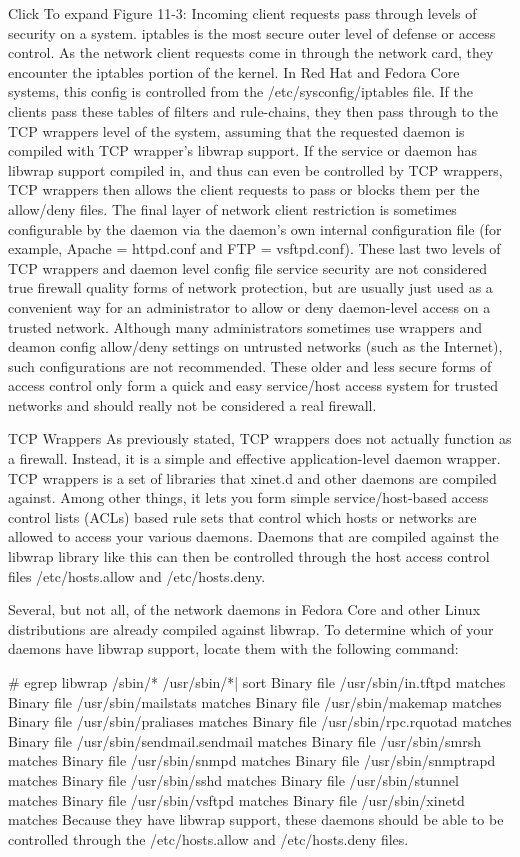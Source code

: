 \documentclass{article}
\begin{document}
\begin{itemize}
Click To expand 
Figure 11-3: Incoming client requests pass through levels of security on a system. iptables is the most secure outer level of defense or access control.
As the network client requests come in through the network card, they encounter the iptables portion of the kernel. In Red Hat and Fedora Core systems, this config is controlled from the /etc/sysconfig/iptables file. If the clients pass these tables of filters and rule-chains, they then pass through to the TCP wrappers level of the system, assuming that the requested daemon is compiled with TCP wrapper's libwrap support. If the service or daemon has libwrap support compiled in, and thus can even be controlled by TCP wrappers, TCP wrappers then allows the client requests to pass or blocks them per the allow/deny files. The final layer of network client restriction is sometimes configurable by the daemon via the daemon's own internal configuration file (for example, Apache = httpd.conf and FTP = vsftpd.conf). These last two levels of TCP wrappers and daemon level config file service security are not considered true firewall quality forms of network protection, but are usually just used as a convenient way for an administrator to allow or deny daemon-level access on a trusted network. Although many administrators sometimes use wrappers and deamon config allow/deny settings on untrusted networks (such as the Internet), such configurations are not recommended. These older and less secure forms of access control only form a quick and easy service/host access system for trusted networks and should really not be considered a real firewall.

TCP Wrappers
As previously stated, TCP wrappers does not actually function as a firewall. Instead, it is a simple and effective application-level daemon wrapper. TCP wrappers is a set of libraries that xinet.d and other daemons are compiled against. Among other things, it lets you form simple service/host-based access control lists (ACLs) based rule sets that control which hosts or networks are allowed to access your various daemons. Daemons that are compiled against the libwrap library like this can then be controlled through the host access control files /etc/hosts.allow and /etc/hosts.deny.

Several, but not all, of the network daemons in Fedora Core and other Linux distributions are already compiled against libwrap. To determine which of your daemons have libwrap support, locate them with the following command:

   \# egrep libwrap /sbin/* /usr/sbin/*| sort
   Binary file /usr/sbin/in.tftpd matches
   Binary file /usr/sbin/mailstats matches
   Binary file /usr/sbin/makemap matches
   Binary file /usr/sbin/praliases matches
   Binary file /usr/sbin/rpc.rquotad matches
   Binary file /usr/sbin/sendmail.sendmail matches
   Binary file /usr/sbin/smrsh matches
   Binary file /usr/sbin/snmpd matches
   Binary file /usr/sbin/snmptrapd matches
   Binary file /usr/sbin/sshd matches
   Binary file /usr/sbin/stunnel matches
   Binary file /usr/sbin/vsftpd matches
   Binary file /usr/sbin/xinetd matches
Because they have libwrap support, these daemons should be able to be controlled through the /etc/hosts.allow and /etc/hosts.deny files.


\end{itemize}
\end{document}
